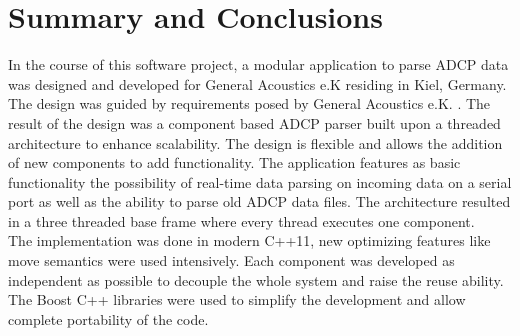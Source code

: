 \chapter{Summary and Conclusions}
In the course of this software project, a modular application to parse ADCP data was designed and developed for General Acoustics e.K residing in Kiel, Germany. The design was guided by requirements posed by General Acoustics e.K. . The result of the design was a component based ADCP parser built upon a threaded architecture to enhance scalability. The design is flexible and allows the addition of new components to add functionality. The application features as basic functionality the possibility of real-time data parsing on incoming data on a serial port as well as the ability to parse old ADCP data files. The architecture resulted in a three threaded base frame where every thread executes one component.\\
The implementation was done in modern C++11, new optimizing features like move semantics were used intensively. Each component was developed as independent as possible to decouple the whole system and raise the reuse ability. The Boost C++ libraries were used to simplify the development and allow complete portability of the code.
